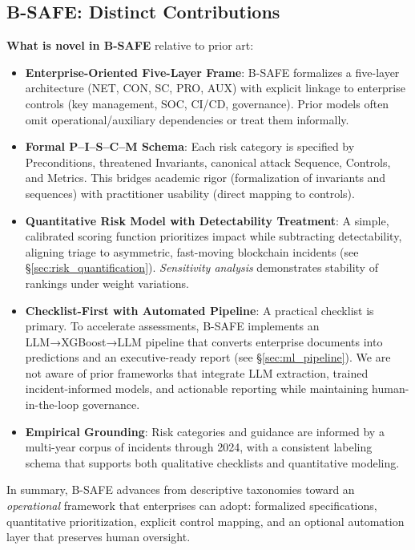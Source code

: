 \subsection*{B-SAFE: Distinct Contributions}
\textbf{What is novel in B-SAFE} relative to prior art:
\begin{itemize}
    \item \textbf{Enterprise-Oriented Five-Layer Frame}: B-SAFE formalizes a five-layer architecture (NET, CON, SC, PRO, AUX) with explicit linkage to enterprise controls (key management, SOC, CI/CD, governance). Prior models often omit operational/auxiliary dependencies or treat them informally.
    \item \textbf{Formal P–I–S–C–M Schema}: Each risk category is specified by Preconditions, threatened Invariants, canonical attack Sequence, Controls, and Metrics. This bridges academic rigor (formalization of invariants and sequences) with practitioner usability (direct mapping to controls).
    \item \textbf{Quantitative Risk Model with Detectability Treatment}: A simple, calibrated scoring function prioritizes impact while subtracting detectability, aligning triage to asymmetric, fast-moving blockchain incidents (see \S\ref{sec:risk_quantification}). \textit{Sensitivity analysis} demonstrates stability of rankings under weight variations.
    \item \textbf{Checklist-First with Automated Pipeline}: A practical checklist is primary. To accelerate assessments, B-SAFE implements an LLM→XGBoost→LLM pipeline that converts enterprise documents into predictions and an executive-ready report (see \S\ref{sec:ml_pipeline}). We are not aware of prior frameworks that integrate LLM extraction, trained incident-informed models, and actionable reporting while maintaining human-in-the-loop governance.
    \item \textbf{Empirical Grounding}: Risk categories and guidance are informed by a multi-year corpus of incidents through 2024, with a consistent labeling schema that supports both qualitative checklists and quantitative modeling.
\end{itemize}

In summary, B-SAFE advances from descriptive taxonomies toward an \textit{operational} framework that enterprises can adopt: formalized specifications, quantitative prioritization, explicit control mapping, and an optional automation layer that preserves human oversight.


